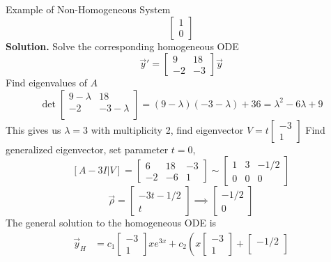 \documentclass{article}
\begin{document}
\begin{multicols*}{3}
\begin{blackbox}{Example of Non-Homogeneous System}
{\[\begin{bmatrix}
            1\\
            0
        \end{bmatrix}\]
        \textbf{Solution.} Solve the corresponding homogeneous ODE
        \[\vec{y}' = \begin{bmatrix}
            9 & 18\\
            -2 & -3
        \end{bmatrix}\vec{y}\]
        Find eigenvalues of $A$
        \[\det\begin{bmatrix}
            9 - \lambda & 18\\
            -2 & -3 - \lambda\\
        \end{bmatrix} = (9 - \lambda)(-3-\lambda) + 36 = \lambda^2 -6\lambda + 9\]
        This gives us $\lambda = 3$ with multiplicity 2, find eigenvector $V = t\begin{bmatrix}-3\\1\end{bmatrix}$
        Find generalized eigenvector, set parameter $t = 0$,
        \[[A - 3I| V] = \begin{bmatrix}
            6 & 18 & -3\\
            -2 & -6 & 1
        \end{bmatrix} \sim \begin{bmatrix}
            1 & 3 & -1/2\\
            0 & 0 & 0
        \end{bmatrix}\]
        \[\vec{\rho} = \begin{bmatrix}
            -3t - 1/2\\
            t
        \end{bmatrix} \implies \begin{bmatrix}
            -1/2\\
            0
        \end{bmatrix}\]
        The general solution to the homogeneous ODE is 
        \begin{align*}
            \vec{y}_H &= c_1\begin{bmatrix}-3\\1\end{bmatrix}xe^{3x} + c_2\left(x\begin{bmatrix}
                -3\\
                1
            \end{bmatrix} + \begin{bmatrix}
                -1/2\\

\end{bmatrix}
\end{align*}}
\end{blackbox}
\end{multicols*}
\end{document}
